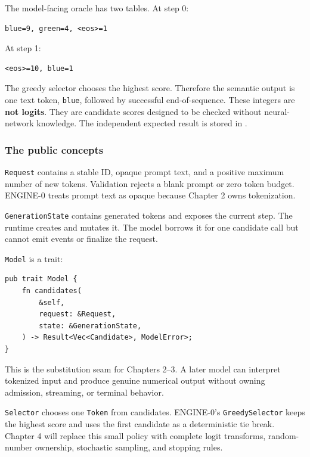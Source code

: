 \documentclass[
  10pt,
]{article}
\begin{document}
The model-facing oracle has two tables. At step 0:

\begin{verbatim}
blue=9, green=4, <eos>=1
\end{verbatim}

At step 1:

\begin{verbatim}
<eos>=10, blue=1
\end{verbatim}

The greedy selector chooses the highest score. Therefore the semantic
output is one text token, \texttt{blue}, followed by successful
end-of-sequence. These integers are \textbf{not logits}. They are
candidate scores designed to be checked without neural-network
knowledge. The independent expected result is stored in
\href{https://github.com/hermonai/inside-the-llm-engine/blob/astra-visual-rewrite/code/reference/engine-0-oracle.md}{\texttt{}}.

\subsubsection{The public concepts}\label{the-public-concepts}

\texttt{Request} contains a stable ID, opaque prompt text, and a
positive maximum number of new tokens. Validation rejects a blank prompt
or zero token budget. ENGINE-0 treats prompt text as opaque because
Chapter 2 owns tokenization.

\texttt{GenerationState} contains generated tokens and exposes the
current step. The runtime creates and mutates it. The model borrows it
for one candidate call but cannot emit events or finalize the request.

\texttt{Model} is a trait:

\begin{verbatim}
pub trait Model {
    fn candidates(
        &self,
        request: &Request,
        state: &GenerationState,
    ) -> Result<Vec<Candidate>, ModelError>;
}
\end{verbatim}

This is the substitution seam for Chapters 2--3. A later model can
interpret tokenized input and produce genuine numerical output without
owning admission, streaming, or terminal behavior.

\texttt{Selector} chooses one \texttt{Token} from candidates. ENGINE-0's
\texttt{GreedySelector} keeps the highest score and uses the first
candidate as a deterministic tie break. Chapter 4 will replace this
small policy with complete logit transforms, random-number ownership,
stochastic sampling, and stopping rules.
\end{document}
